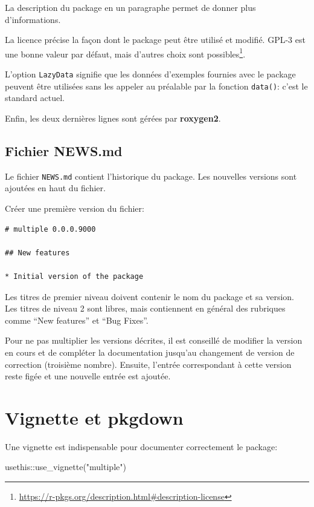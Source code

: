 \documentclass[
  11pt,
  french,
  a4paper,
  extrafontsizes,onecolumn,openright
  ]{memoir}
\newenvironment{Shaded}{\begin{snugshade}}{\end{snugshade}}
\newcommand{\FunctionTok}[1]{\textcolor[rgb]{0.00,0.00,0.00}{#1}}
\newcommand{\NormalTok}[1]{#1}
\newcommand{\SpecialCharTok}[1]{\textcolor[rgb]{0.00,0.00,0.00}{#1}}
\newcommand{\StringTok}[1]{\textcolor[rgb]{0.31,0.60,0.02}{#1}}
\begin{document}
La description du package en un paragraphe permet de donner plus d'informations.

La licence précise la façon dont le package peut être utilisé et modifié.
GPL-3 est une bonne valeur par défaut, mais d'autres choix sont possibles\footnote{\url{https://r-pkgs.org/description.html\#description-license}}.

L'option \texttt{LazyData} signifie que les données d'exemples fournies avec le package peuvent être utilisées sans les appeler au préalable par la fonction \texttt{data()}: c'est le standard actuel.

Enfin, les deux dernières lignes sont gérées par \textbf{roxygen2}.

\hypertarget{fichier-news.md}{%
\subsection{Fichier NEWS.md}\label{fichier-news.md}}

Le fichier \texttt{NEWS.md} contient l'historique du package.
Les nouvelles versions sont ajoutées en haut du fichier.

Créer une première version du fichier:

\begin{verbatim}
# multiple 0.0.0.9000

## New features

* Initial version of the package
\end{verbatim}

Les titres de premier niveau doivent contenir le nom du package et sa version.
Les titres de niveau 2 sont libres, mais contiennent en général des rubriques comme ``New features'' et ``Bug Fixes''.

Pour ne pas multiplier les versions décrites, il est conseillé de modifier la version en cours et de compléter la documentation jusqu'au changement de version de correction (troisième nombre).
Ensuite, l'entrée correspondant à cette version reste figée et une nouvelle entrée est ajoutée.

\hypertarget{vignette-et-pkgdown}{%
\section{Vignette et pkgdown}\label{vignette-et-pkgdown}}

Une vignette est indispensable pour documenter correctement le package:

\scriptsize

\begin{Shaded}
\begin{Highlighting}[]
\NormalTok{usethis}\SpecialCharTok{::}\FunctionTok{use\_vignette}\NormalTok{(}\StringTok{"multiple"}\NormalTok{)}
\end{Highlighting}
\end{Shaded}
\end{document}
